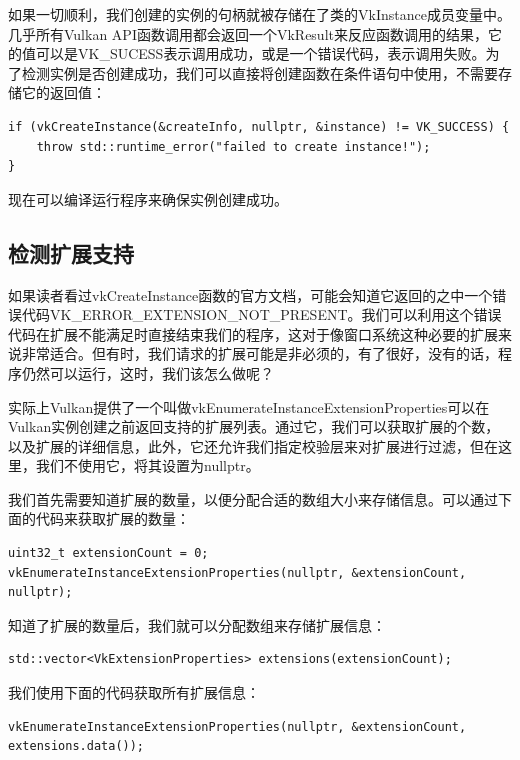 \documentclass{ctexart}
\begin{document}
如果一切顺利，我们创建的实例的句柄就被存储在了类的VkInstance成员变量中。几乎所有Vulkan API函数调用都会返回一个VkResult来反应函数调用的结果，它的值可以是VK\_SUCESS表示调用成功，或是一个错误代码，表示调用失败。为了检测实例是否创建成功，我们可以直接将创建函数在条件语句中使用，不需要存储它的返回值：

\begin{lstlisting}[language={[ANSI]C}]
if (vkCreateInstance(&createInfo, nullptr, &instance) != VK_SUCCESS) {
	throw std::runtime_error("failed to create instance!");
}
\end{lstlisting}

现在可以编译运行程序来确保实例创建成功。

\subsection{检测扩展支持}

如果读者看过vkCreateInstance函数的官方文档，可能会知道它返回的之中一个错误代码VK\_ERROR\_EXTENSION\_NOT\_PRESENT。我们可以利用这个错误代码在扩展不能满足时直接结束我们的程序，这对于像窗口系统这种必要的扩展来说非常适合。但有时，我们请求的扩展可能是非必须的，有了很好，没有的话，程序仍然可以运行，这时，我们该怎么做呢？

实际上Vulkan提供了一个叫做vkEnumerateInstanceExtensionProperties可以在Vulkan实例创建之前返回支持的扩展列表。通过它，我们可以获取扩展的个数，以及扩展的详细信息，此外，它还允许我们指定校验层来对扩展进行过滤，但在这里，我们不使用它，将其设置为nullptr。

我们首先需要知道扩展的数量，以便分配合适的数组大小来存储信息。可以通过下面的代码来获取扩展的数量：

\begin{lstlisting}[language={[ANSI]C}]
uint32_t extensionCount = 0;
vkEnumerateInstanceExtensionProperties(nullptr, &extensionCount, nullptr);
\end{lstlisting}

知道了扩展的数量后，我们就可以分配数组来存储扩展信息：

\begin{lstlisting}[language={[ANSI]C}]
std::vector<VkExtensionProperties> extensions(extensionCount);
\end{lstlisting}

我们使用下面的代码获取所有扩展信息：

\begin{lstlisting}[language={[ANSI]C}]
vkEnumerateInstanceExtensionProperties(nullptr, &extensionCount, extensions.data());
\end{lstlisting}
\end{document}
